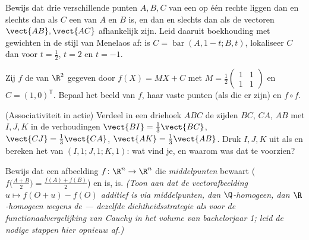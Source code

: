 \begin{exercise}[$\star$]\label{exo:b2:affine:2}
Bewijs dat drie verschillende punten $A, B, C$ van een  op één rechte liggen dan en slechts dan als $C$ een
 van $A$ en $B$ is, en dan en slechts dan als de
vectoren $\vect{AB}, \vect{AC}$ afhankelijk zijn. Leid daaruit
boekhouding met gewichten in de stijl van Menelaos af: is $C =
\operatorname{bar}(A, 1 - t; B, t)$, lokaliseer $C$ dan voor $t =
\frac12$, $t = 2$ en $t = -1$.
\end{exercise}

\begin{exercise}[$\star$]\label{exo:b2:affine:3}
Zij $f$ de  van $\R^2$ gegeven door $f(X) = MX +
C$ met $M = \frac12\begin{pmatrix} 1 & 1\\ 1 & 1\end{pmatrix}$ en
$C = (1, 0)^{\mathsf T}$. Bepaal het beeld van $f$, haar vaste
punten (als die er zijn) en $f \circ f$.
\end{exercise}

\begin{exercise}[$\star\star$]\label{exo:b2:affine:4}
(Associativiteit in actie) Verdeel in een driehoek $ABC$ de zijden
$BC$, $CA$, $AB$ met $I, J, K$ in de verhoudingen $\vect{BI} =
\frac13\vect{BC}$, $\vect{CJ} = \frac13\vect{CA}$, $\vect{AK} =
\frac13\vect{AB}$. Druk $I, J, K$ uit als  en bereken het
 van $(I,1;J,1;K,1)$: wat vind je, en waarom was dat te
voorzien?
\end{exercise}

\begin{exercise}[$\star\star$]\label{exo:b2:affine:5}
Bewijs dat een afbeelding $f \colon \R^n \to \R^n$ die
\emph{middelpunten} bewaart ($f\bigl(\frac{A+B}{2}\bigr) =
\frac{f(A) + f(B)}{2}$) en \emph{} is,  is.
\emph{(Toon aan dat de vectorafbeelding $u \mapsto f(O + u) - f(O)$
additief is via middelpunten, dan $\Q$-homogeen, dan
$\R$-homogeen wegens de  --- dezelfde
dichtheidsstrategie als voor de functionaalvergelijking van Cauchy
in het volume van bachelorjaar 1; leid de nodige stappen hier
opnieuw af.)}
\end{exercise}

